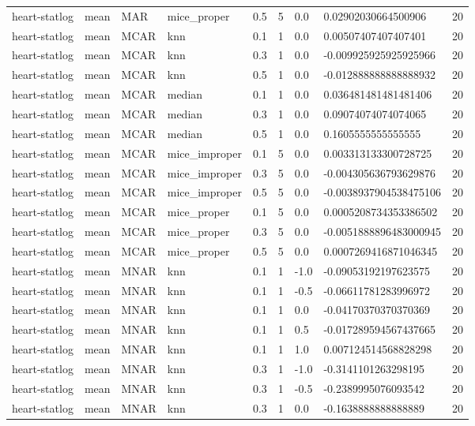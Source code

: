 \begin{tabular}{lllllllll}
heart-statlog & mean & MAR & mice\_proper & 0.5 & 5 & 0.0 & 0.02902030664500906 & 20 \\
heart-statlog & mean & MCAR & knn & 0.1 & 1 & 0.0 & 0.00507407407407401 & 20 \\
heart-statlog & mean & MCAR & knn & 0.3 & 1 & 0.0 & -0.009925925925925966 & 20 \\
heart-statlog & mean & MCAR & knn & 0.5 & 1 & 0.0 & -0.012888888888888932 & 20 \\
heart-statlog & mean & MCAR & median & 0.1 & 1 & 0.0 & 0.036481481481481406 & 20 \\
heart-statlog & mean & MCAR & median & 0.3 & 1 & 0.0 & 0.09074074074074065 & 20 \\
heart-statlog & mean & MCAR & median & 0.5 & 1 & 0.0 & 0.1605555555555555 & 20 \\
heart-statlog & mean & MCAR & mice\_improper & 0.1 & 5 & 0.0 & 0.003313133300728725 & 20 \\
heart-statlog & mean & MCAR & mice\_improper & 0.3 & 5 & 0.0 & -0.004305636793629876 & 20 \\
heart-statlog & mean & MCAR & mice\_improper & 0.5 & 5 & 0.0 & -0.0038937904538475106 & 20 \\
heart-statlog & mean & MCAR & mice\_proper & 0.1 & 5 & 0.0 & 0.0005208734353386502 & 20 \\
heart-statlog & mean & MCAR & mice\_proper & 0.3 & 5 & 0.0 & -0.0051888896483000945 & 20 \\
heart-statlog & mean & MCAR & mice\_proper & 0.5 & 5 & 0.0 & 0.0007269416871046345 & 20 \\
heart-statlog & mean & MNAR & knn & 0.1 & 1 & -1.0 & -0.09053192197623575 & 20 \\
heart-statlog & mean & MNAR & knn & 0.1 & 1 & -0.5 & -0.06611781283996972 & 20 \\
heart-statlog & mean & MNAR & knn & 0.1 & 1 & 0.0 & -0.04170370370370369 & 20 \\
heart-statlog & mean & MNAR & knn & 0.1 & 1 & 0.5 & -0.017289594567437665 & 20 \\
heart-statlog & mean & MNAR & knn & 0.1 & 1 & 1.0 & 0.007124514568828298 & 20 \\
heart-statlog & mean & MNAR & knn & 0.3 & 1 & -1.0 & -0.3141101263298195 & 20 \\
heart-statlog & mean & MNAR & knn & 0.3 & 1 & -0.5 & -0.2389995076093542 & 20 \\
heart-statlog & mean & MNAR & knn & 0.3 & 1 & 0.0 & -0.1638888888888889 & 20 \\

\end{tabular}
